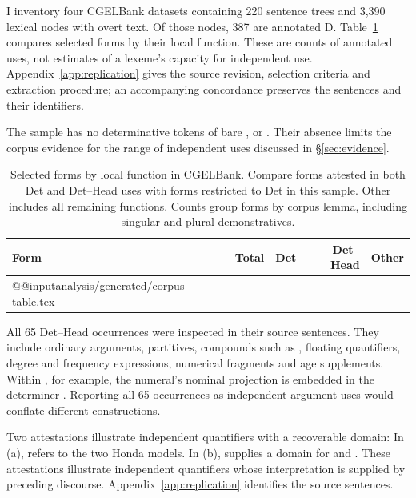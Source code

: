 \documentclass[12pt]{article}
\makeatletter
\newcommand{\tablebody}[1]{\csname @@input\endcsname #1 }
\makeatother
\begin{document}
I inventory four CGELBank datasets containing 220 sentence trees and 3,390 lexical nodes with overt text. Of those nodes, 387 are annotated D. Table~\ref{tab:corpus} compares selected forms by their local function. These are counts of annotated uses, not estimates of a lexeme's capacity for independent use. Appendix~\ref{app:replication} gives the source revision, selection criteria and extraction procedure; an accompanying concordance preserves the sentences and their identifiers.

The sample has no determinative tokens of bare ,  or . Their absence limits the corpus evidence for the range of independent uses discussed in §\ref{sec:evidence}.

\begin{table}[tb]
\centering\small
\caption{Selected forms by local function in CGELBank. Compare forms attested in both Det and Det--Head uses with forms restricted to Det in this sample. Other includes all remaining functions. Counts group forms by corpus lemma, including singular and plural demonstratives.}\label{tab:corpus}
\begin{tabular}{lrrrr}
\toprule
Form & Total & Det & Det--Head & Other \\
\midrule
\tablebody{analysis/generated/corpus-table.tex}
\bottomrule
\end{tabular}
\end{table}

All 65 Det--Head occurrences were inspected in their source sentences. They include ordinary arguments, partitives, compounds such as , floating quantifiers, degree and frequency expressions, numerical fragments and age supplements. Within , for example, the numeral's nominal projection is embedded in the determiner . Reporting all 65 occurrences as independent argument uses would conflate different constructions.

Two attestations illustrate independent quantifiers with a recoverable domain:
\ea\label{ex:attested-quantifiers}
\ea {}
\ex {}
\z\z
In (a),  refers to the two Honda models. In (b),  supplies a domain for  and . These attestations illustrate independent quantifiers whose interpretation is supplied by preceding discourse. Appendix~\ref{app:replication} identifies the source sentences.
\end{document}
